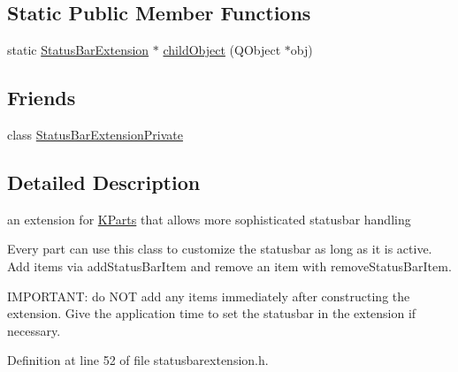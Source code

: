 \subsection*{Static Public Member Functions}
\begin{DoxyCompactItemize}
\item 
static \hyperlink{classKParts_1_1StatusBarExtension}{Status\+Bar\+Extension} $\ast$ \hyperlink{classKParts_1_1StatusBarExtension_a69c6c7a09941dd6c70b315a4c21f3f20}{child\+Object} (Q\+Object $\ast$obj)
\end{DoxyCompactItemize}
\subsection*{Friends}
\begin{DoxyCompactItemize}
\item 
class \hyperlink{classKParts_1_1StatusBarExtension_ad7fbe21a7ea073280f28211d53f7d775}{Status\+Bar\+Extension\+Private}
\end{DoxyCompactItemize}


\subsection{Detailed Description}
an extension for \hyperlink{namespaceKParts}{K\+Parts} that allows more sophisticated statusbar handling 

Every part can use this class to customize the statusbar as long as it is active. Add items via add\+Status\+Bar\+Item and remove an item with remove\+Status\+Bar\+Item.

I\+M\+P\+O\+R\+T\+A\+N\+T\+: do N\+O\+T add any items immediately after constructing the extension. Give the application time to set the statusbar in the extension if necessary. 

Definition at line 52 of file statusbarextension.\+h.



